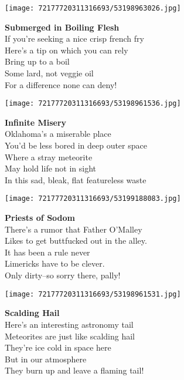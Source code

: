 \documentclass[10pt,letterpaper]{article}
\begin{document}
\begin{center}\texttt{[image: 72177720311316693/53198963026.jpg]}
\end{center}
\begin{center}
\textbf{Submerged in Boiling Flesh}\\
\vskip 0.2in
If you're seeking a nice crisp french fry\\
Here's a tip on which you can rely\\
Bring up to a boil\\
Some lard, not veggie oil\\
For a difference none can deny!\\
\end{center}
\pagebreak

\begin{center}\texttt{[image: 72177720311316693/53198961536.jpg]}
\end{center}
\begin{center}
\textbf{Infinite Misery}\\
\vskip 0.2in
Oklahoma's a miserable place\\
You'd be less bored in deep outer space\\
Where a stray meteorite\\
May hold life not in sight\\
In this sad, bleak, flat featureless waste\\
\end{center}
\pagebreak

\begin{center}
\texttt{[image: 72177720311316693/53199188083.jpg]}
\end{center}

\begin{center}
\textbf{Priests of Sodom}\\
\vskip 0.2in
There's a rumor that Father O'Malley\\
Likes to get buttfucked out in the alley.\\
It has been a rule never\\
Limericks have to be clever.\\
Only dirty--so sorry there, pally!\\
\end{center}
\pagebreak

\begin{center}\texttt{[image: 72177720311316693/53198961531.jpg]}
\end{center}
\begin{center}
\textbf{Scalding Hail}\\
\vskip 0.2in
Here's an interesting astronomy tail\\
Meteorites are just like scalding hail\\
They're ice cold in space here\\
But in our atmosphere\\
They burn up and leave a flaming tail!\\
\end{center}
\pagebreak
\end{document}
